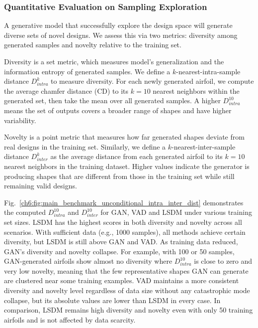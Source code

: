 \subsubsection{Quantitative Evaluation on Sampling Exploration}

A generative model that successfully explore the design space will generate diverse sets of novel designs. We assess this via two metrics: diversity among generated samples and novelty relative to the training set.

Diversity is a set metric, which measures model's generalization and the information entropy of generated samples. We define a $k$-nearest-intra-sample distance $D_{intra}^k$ to measure diversity. For each newly generated airfoil, we compute the average chamfer distance (CD) to its $k=10$ nearest neighbors within the generated set, then take the mean over all generated samples. A higher $D_{intra}^{10}$ means the set of outputs covers a broader range of shapes and have higher variability.

Novelty is a point metric that measures how far generated shapes deviate from real designs in the training set. Similarly, we define a $k$-nearest-inter-sample distance $D_{inter}^k$ as the average distance from each generated airfoil to its $k=10$ nearest neighbors in the training dataset. Higher values indicate the generator is producing shapes that are different from those in the training set while still remaining valid designs.

Fig.~\ref{ch6:fig:main_benchmark_unconditional_intra_inter_dist} demonstrates the computed $D_{intra}^{10}$ and $D_{inter}^{10}$ for GAN, VAD and LSDM under various training set sizes. LSDM has the highest scores in both diversity and novelty across all scenarios. With sufficient data (e.g., 1000 samples), all methods achieve certain diversity, but LSDM is still above GAN and VAD. As training data reduced, GAN’s diversity and novelty collapse. For example, with 100 or 50 samples, GAN-generated airfoils show almost no diversity where $D_{intra}^{10}$ is close to zero and very low novelty, meaning that the few representative shapes GAN can generate are clustered near some training examples. VAD maintains a more consistent diversity and novelty level regardless of data size without any catastrophic mode collapse, but its absolute values are lower than LSDM in every case. In comparison, LSDM remains high diversity and novelty even with only 50 training airfoils and is not affected by data scarcity.

